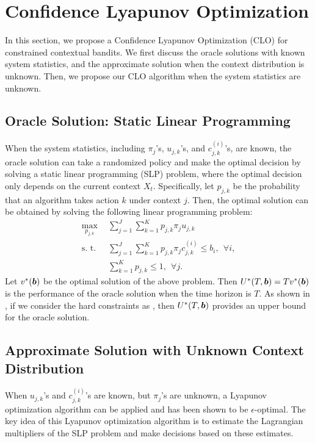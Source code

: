 
\section{Confidence Lyapunov Optimization}


In this section, we propose a Confidence Lyapunov Optimization (CLO) for constrained contextual bandits. We first discuss the oracle solutions with known system statistics, and the approximate solution when the context distribution is unknown. Then, we propose our CLO algorithm when the system statistics are unknown.

\subsection{Oracle Solution: Static Linear Programming}
When the system statistics, including $\pi_j$'s, $u_{j,k}$'s, and $c_{j,k}^{(i)}$'s, are known, the oracle solution can take a randomized policy and make the optimal decision by solving a static linear programming (SLP) problem, where the optimal decision only depends on the current context $X_t$. Specifically, let $p_{j,k}$ be the probability that an algorithm takes action $k$ under context $j$. Then, the optimal solution can be obtained by solving the following linear programming problem:
\begin{align}
\underset{p_{j,k}}{\text{max}}&~~  \sum_{j= 1}^J \sum_{k = 1}^K p_{j,k} \pi_j u_{j,k}\\
\text{s.~t.} &~~ \sum_{j=1}^J \sum_{k = 1}^K p_{j,k} \pi_j c_{j,k}^{(i)} \leq b_i, ~~\forall i,  \\
&~~ \sum_{k = 1}^K p_{j,k} \leq 1,~~\forall j.
\end{align}
Let $v^*(\boldsymbol{b})$ be the optimal solution of the above problem. Then  $U^*(T, \boldsymbol{b}) = T v^*(\boldsymbol{b})$ is the performance of the oracle solution when the time horizon is $T$. As shown in \cite{Wu2015NIPS:CCB}, if we consider the hard constraints as \cite{Badanidiyuru2014COLT,Wu2015NIPS:CCB}, then $U^*(T, \boldsymbol{b})$ provides an upper bound for the oracle solution.

\subsection{Approximate Solution with Unknown Context Distribution}

When $u_{j,k}$'s and $c^{(i)}_{j,k}$'s are known, but $\pi_j$'s are unknown, a Lyapunov optimization algorithm \cite{Neely2010Book:BP} can be applied and has been shown to be $\epsilon$-optimal.
The key idea of this Lyapunov optimization algorithm is to estimate the Lagrangian multipliers of the SLP problem and make decisions based on these estimates.

